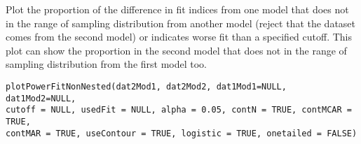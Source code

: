 \documentclass[a4paper]{book}
\begin{document}
%
\begin{Description}\relax
Plot the proportion of the difference in fit indices from one model that does not in the range of sampling distribution from another model (reject that the dataset comes from the second model) or indicates worse fit than a specified cutoff. This plot can show the proportion in the second model that does not in the range of sampling distribution from the first model too.
\end{Description}
%
\begin{Usage}
\begin{verbatim}
plotPowerFitNonNested(dat2Mod1, dat2Mod2, dat1Mod1=NULL, dat1Mod2=NULL, 
cutoff = NULL, usedFit = NULL, alpha = 0.05, contN = TRUE, contMCAR = TRUE, 
contMAR = TRUE, useContour = TRUE, logistic = TRUE, onetailed = FALSE)
\end{verbatim}
\end{Usage}
%
\end{document}

